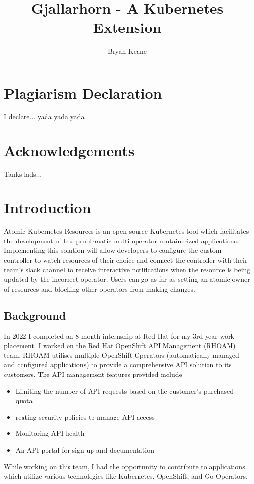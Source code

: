 \documentclass{article}
\title{Gjallarhorn - A Kubernetes Extension}
\author{Bryan Keane}
\begin{document}
\maketitle
\newpage

\tableofcontents
\newpage

\listoffigures
\newpage

\listoftables
\newpage

\section{Plagiarism Declaration}
I declare... yada yada yada
\section{Acknowledgements}
Tanks lads... 

\section{Introduction}
Atomic Kubernetes Resources is an open-source Kubernetes tool which facilitates the development of less problematic multi-operator containerized applications. Implementing this solution will allow developers to configure the custom controller to watch resources of their choice and connect the controller with their team’s slack channel to receive interactive notifications when the resource is being updated by the incorrect operator. Users can go as far as setting an atomic owner of resources and blocking other operators from making changes.

\subsection{Background}
In 2022 I completed an 8-month internship at Red Hat for my 3rd-year work placement. I worked on the Red Hat OpenShift API Management (RHOAM) team. RHOAM utilises multiple OpenShift Operators (automatically managed and configured applications) to provide a comprehensive API solution to its customers. The API management features provided include
\begin{itemize}
    \item Limiting the number of API requests based on the customer’s purchased quota
    \item reating security policies to manage API access
    \item Monitoring API health
    \item An API portal for sign-up and documentation
\end{itemize}
While working on this team, I had the opportunity to contribute to applications which utilize various technologies like Kubernetes, OpenShift, and Go Operators.
\end{document}
